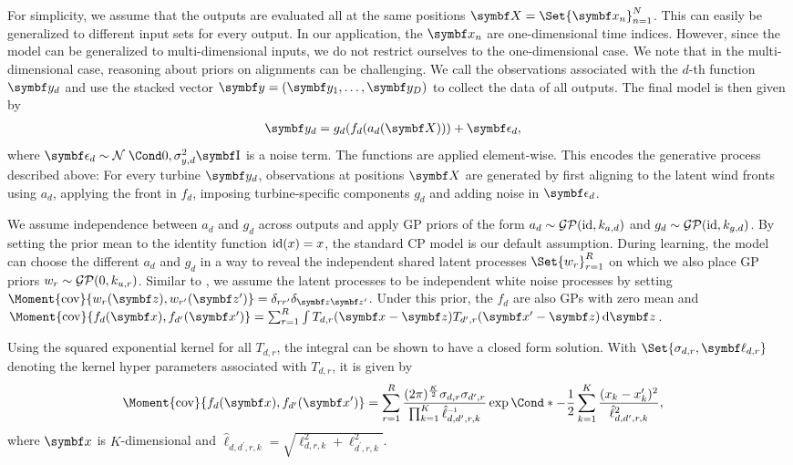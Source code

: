 For simplicity, we assume that the outputs are evaluated all at the same positions $\mat{X} = \Set{\mat{x_n}}_{n=1}^N$.
This can easily be generalized to different input sets for every output.
In our application, the $\mat{x_n}$ are one-dimensional time indices.
However, since the model can be generalized to multi-dimensional inputs, we do not restrict ourselves to the one-dimensional case.
We note that in the multi-dimensional case, reasoning about priors on alignments can be challenging.
We call the observations associated with the $d$-th function $\mat{y_d}$ and use the stacked vector $\mat{y} = \left( \mat{y_1}, \dots, \mat{y_D} \right)$ to collect the data of all outputs.
The final model is then given by
\begin{align}
    \mat{y_d} &= g_d(f_d(a_d(\mat{X}))) + \mat{\epsilon_d},
\end{align}
where $\mat{\epsilon_d} \sim \Gaussian{0, \sigma_{y, d}^2\Eye}$ is a noise term.
The functions are applied element-wise.
This encodes the generative process described above:
For every turbine $\rv{y_d}$, observations at positions $\rv{X}$ are generated by first aligning to the latent wind fronts using $a_d$, applying the front in $f_d$, imposing turbine-specific components $g_d$ and adding noise in $\rv{\epsilon_d}$.

We assume independence between $a_d$ and $g_d$ across outputs and apply GP priors of the form $a_d \sim \operatorname{\mathcal{GP}}(\operatorname{id}, k_{a, d})$ and $g_d \sim \operatorname{\mathcal{GP}}(\operatorname{id}, k_{g, d})$.
By setting the prior mean to the identity function $\operatorname{id}(x) = x$, the standard CP model is our default assumption.
During learning, the model can choose the different $a_d$ and $g_d$ in a way to reveal the independent shared latent processes $\Set{w_r}_{r=1}^R$ on which we also place GP priors $w_r \sim \operatorname{\mathcal{GP}}(0, k_{u, r})$.
Similar to \textcite{boyle_dependent_2004}, we assume the latent processes to be independent white noise processes by setting $\Moment{\cov}{w_r(\mat{z}), w_{r^\prime}(\mat{z^\prime})} = \delta_{rr^\prime}\delta_{\mat{z}\mat{z^\prime}}$.
Under this prior, the $f_d$ are also GPs with zero mean and $\Moment{\cov}{f_d(\mat{x}), f_{d^\prime}(\mat{x^\prime})} = \sum_{r=1}^R \int T_{d,r}(\mat{x} - \mat{z}) T_{d^\prime,r}(\mat{x^\prime} - \mat{z}) \diff \mat{z}$.

Using the squared exponential kernel for all $T_{d, r}$, the integral can be shown to have a closed form solution.
With $\Set{\sigma_{d,r}, \mat{\ell_{d, r}}}$ denoting the kernel hyper parameters associated with $T_{d,r}$, it is given by
\begin{align}
\label{eq:timeseries_alignment:dependent_kernel}
\begin{split}
    \MoveEqLeft[1] \Moment{\cov}{f_d(\mat{x}), f_{d^\prime}(\mat{x^\prime})} = \sum_{r=1}^R \frac{(2\pi)^{\frac{K}{2}}\sigma_{d, r}\sigma_{d^\prime, r}}{\prod_{k=1}^K \hat{\ell}_{d, d^\prime, r, k}\inv} \Fun*{\exp}{-\frac{1}{2} \sum_{k=1}^K \frac{(x_k - x^\prime_k)^2}{\hat{\ell}_{d, d^\prime, r, k}^2}},
\end{split}
\end{align}
where $\mat{x}$ is $K$-dimensional and $\hat{\ell}_{d, d^\prime, r, k} = \sqrt{\ell_{d, r, k}^2 + \ell_{d^\prime, r, k}^2}$.


